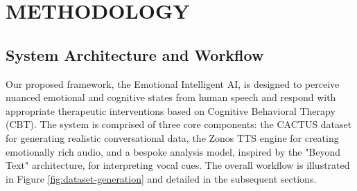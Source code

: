 \setlength{\footskip}{8mm}

\chapter{METHODOLOGY}




\section{System Architecture and Workflow}
Our proposed framework, the Emotional Intelligent AI, is designed to perceive nuanced emotional and cognitive states from human speech and respond with appropriate therapeutic interventions based on Cognitive Behavioral Therapy (CBT). The system is comprised of three core components: the CACTUS dataset for generating realistic conversational data, the Zonos TTS engine for creating emotionally rich audio, and a bespoke analysis model, inspired by the "Beyond Text" architecture, for interpreting vocal cues. The overall workflow is illustrated in Figure \ref{fig:dataset-generation} and detailed in the subsequent sections.

